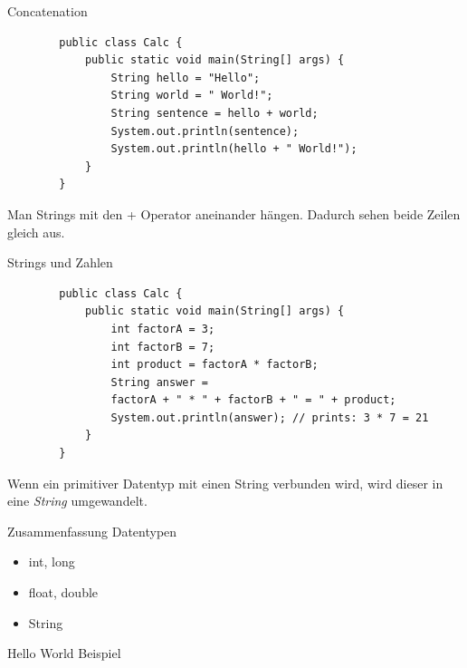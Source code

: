 \begin{frame}[fragile]{Concatenation}
	\begin{lstlisting}
		public class Calc {
			public static void main(String[] args) {
				String hello = "Hello";
				String world = " World!";
				String sentence = hello + world;
				System.out.println(sentence);
				System.out.println(hello + " World!");
			}
		}
	\end{lstlisting}
	Man Strings mit den + Operator aneinander hängen. Dadurch sehen beide Zeilen gleich aus.
\end{frame}

\begin{frame}[fragile]{Strings und Zahlen}
	\begin{lstlisting}
		public class Calc {
			public static void main(String[] args) {
				int factorA = 3;
				int factorB = 7;
				int product = factorA * factorB;
				String answer =
				factorA + " * " + factorB + " = " + product;
				System.out.println(answer); // prints: 3 * 7 = 21
			}
		}
	\end{lstlisting}
	Wenn ein primitiver Datentyp mit einen String verbunden wird, wird dieser in eine \emph{String} umgewandelt.
\end{frame}

\begin{frame}{Zusammenfassung}
	Datentypen
	\begin{itemize}
		\item int, long
		\item float, double
		\item String
	\end{itemize}
	Hello World Beispiel
\end{frame}

